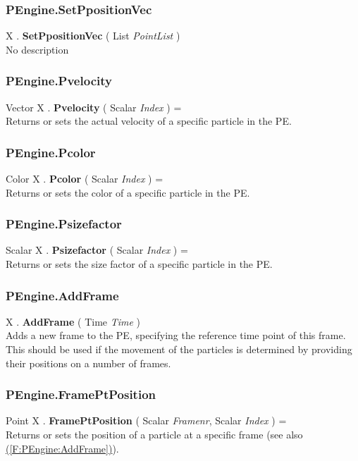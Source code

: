 \documentclass[10pt]{book}
\newcommand{\linkitem}[1]{\hyperref[#1]{\nameref{#1} (\ref{#1})}}
\begin{document}
\subsubsection{PEngine.SetPpositionVec \label{F:PEngine:SetPpositionVec}}
X . \textbf{SetPpositionVec} ( List \textit{PointList} ) \\
No description

\subsubsection{PEngine.Pvelocity \label{F:PEngine:Pvelocity}}
Vector X . \textbf{Pvelocity} ( Scalar \textit{Index} ) = \\
Returns or sets the actual velocity of a specific particle in the PE.

\subsubsection{PEngine.Pcolor \label{F:PEngine:Pcolor}}
Color X . \textbf{Pcolor} ( Scalar \textit{Index} ) = \\
Returns or sets the color of a specific particle in the PE.

\subsubsection{PEngine.Psizefactor \label{F:PEngine:Psizefactor}}
Scalar X . \textbf{Psizefactor} ( Scalar \textit{Index} ) = \\
Returns or sets the size factor of a specific particle in the PE.

\subsubsection{PEngine.AddFrame \label{F:PEngine:AddFrame}}
X . \textbf{AddFrame} ( Time \textit{Time} ) \\
Adds a new frame to the PE, specifying the reference time point of this frame. This should be used if the movement of the particles is determined by providing their positions on a number of frames.

\subsubsection{PEngine.FramePtPosition \label{F:PEngine:FramePtPosition}}
Point X . \textbf{FramePtPosition} ( Scalar \textit{Framenr}, Scalar \textit{Index} ) = \\
Returns or sets the position of a particle at a specific frame (see also \linkitem{F:PEngine:AddFrame}).
\end{document}
